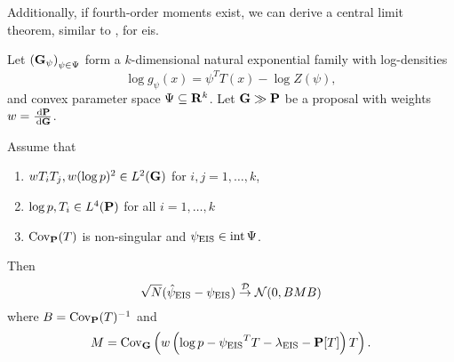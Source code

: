 Additionally, if fourth-order moments exist, we can derive a central limit theorem, similar to , for \acrshort{eis}.

\begin{theorem}
    \label{thm:eis-clt}
    Let $\left( \G_{\psi} \right)_{\psi \in \Psi}$ form a $k$-dimensional natural exponential family with log-densities 
    $$
    \log g_{\psi}(x) = \psi^{T} T(x) - \log Z(\psi),
    $$
    and convex parameter space $\Psi \subseteq \R^{k}$. Let $\G \gg \P$ be a proposal with weights $w = \rnd{\P}{\G}$. 

    Assume that
    \begin{enumerate}
        \item\label{it:secondISmomentsexist}$w T_{i}T_{j}, w (\log p)^{2} \in L^{2}(\G)$ for $i,j = 1, \dots, k$,
        \item\label{it:fourthmomentsexist} $\log p, T_i \in L^{4}(\P)$ for all $i = 1, \dots, k$
        \item $\cov_{\P}(T)$ is non-singular and $\peis \in \operatorname{int} \Psi$.
    \end{enumerate}

    Then 
    $$
        \sqrt{N} (\hpeis - \peis) \convD \Normal (0, BMB)
    $$
    where $B = \cov_{\P}(T)^{-1}$ and 
    $$
    M = \cov_{\G} \left( w \left( \log p - \peis^{T}T - \lambda_{\eis} - \P[T] \right)T \right).
    $$
\end{theorem}

